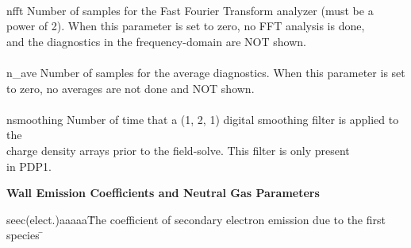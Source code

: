 \begin{section}
\begin{subsection}
\begin{subsubsection}
\begin{tabbing}
							\\
      nfft      \>  Number of samples for the Fast Fourier Transform analyzer
                    (must be a \> \\
		\>  power of 2).  When this parameter is set to
                    zero, no FFT analysis is done, \> \\
		\>  and the diagnostics in the
                    frequency-domain are NOT shown. \> \\
									\\
		n\_ave \> Number of samples for the average diagnostics.  When this parameter is set \>\\
		\> to zero, no averages are not done and NOT shown. \> \\
						\\
      nsmoothing \> Number of time that a (1, 2, 1) digital smoothing filter is
                    applied to the \> \\
		\>  charge density arrays prior to the
                    field-solve.  This filter is only present \> \\
		\>  in PDP1. \> \\
\end{tabbing}
\end{subsubsection}

\begin{subsubsection}
{\bf Wall Emission Coefficients and Neutral Gas Parameters}

\begin{tabbing}

      seec(elect.)aaaaa\=  The coefficient of secondary electron emission due to the
                    first species \= \kill


\end{tabbing}
\end{subsubsection}
\end{subsection}
\end{section}
